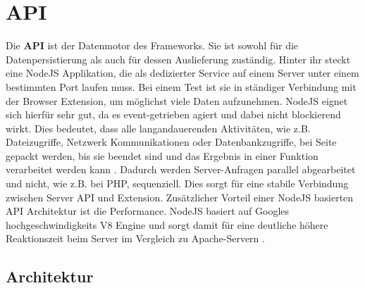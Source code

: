 %
%
%
%

\section{API}

Die \textbf{API} ist der Datenmotor des Frameworks. Sie ist sowohl für die Datenpersistierung als auch für dessen Auslieferung zuständig. Hinter ihr steckt eine NodeJS Applikation, die als dedizierter Service auf einem Server unter einem bestimmten Port laufen muss. Bei einem Test ist sie in ständiger Verbindung mit der Browser Extension, um möglichst viele Daten aufzunehmen. NodeJS eignet sich hierfür sehr gut, da es event-getrieben agiert und dabei nicht blockierend wirkt. Dies bedeutet, dass alle langandauerenden Aktivitäten, wie z.B. Dateizugriffe, Netzwerk Kommunikationen oder Datenbankzugriffe, bei Seite gepackt werden, bis sie beendet sind und das Ergebnis in einer Funktion verarbeitet werden kann \cite{nonblocking}. Dadurch werden Server-Anfragen parallel abgearbeitet und nicht, wie z.B. bei PHP, sequenziell. Dies sorgt für eine stabile Verbindung zwischen Server API und Extension. Zusätzlicher Vorteil einer NodeJS basierten API Architektur ist die Performance. NodeJS basiert auf Googles hochgeschwindigkeits V8 Engine und sorgt damit für eine deutliche höhere Reaktionszeit beim Server im Vergleich zu Apache-Servern \cite{nodevsphp}.


\subsection{Architektur}

